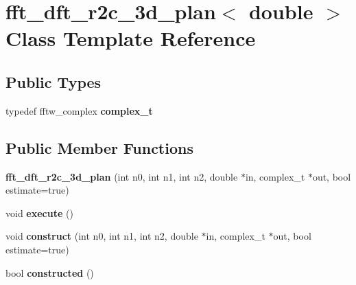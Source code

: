 \hypertarget{classfft__dft__r2c__3d__plan_3_01double_01_4}{
\section{fft\_\-dft\_\-r2c\_\-3d\_\-plan$<$ double $>$ Class Template Reference}
\label{classfft__dft__r2c__3d__plan_3_01double_01_4}
}
\subsection*{Public Types}
\begin{DoxyCompactItemize}
\item 
\hypertarget{classfft__dft__r2c__3d__plan_3_01double_01_4_acb9081f5188f58c64467774b303680a0}{
typedef fftw\_\-complex {\bfseries complex\_\-t}}
\label{classfft__dft__r2c__3d__plan_3_01double_01_4_acb9081f5188f58c64467774b303680a0}

\end{DoxyCompactItemize}
\subsection*{Public Member Functions}
\begin{DoxyCompactItemize}
\item 
\hypertarget{classfft__dft__r2c__3d__plan_3_01double_01_4_af16576afef3939eb04b476a6d3589f30}{
{\bfseries fft\_\-dft\_\-r2c\_\-3d\_\-plan} (int n0, int n1, int n2, double $\ast$in, complex\_\-t $\ast$out, bool estimate=true)}
\label{classfft__dft__r2c__3d__plan_3_01double_01_4_af16576afef3939eb04b476a6d3589f30}

\item 
\hypertarget{classfft__dft__r2c__3d__plan_3_01double_01_4_acd216507da9226fbb4e2ffd9da091296}{
void {\bfseries execute} ()}
\label{classfft__dft__r2c__3d__plan_3_01double_01_4_acd216507da9226fbb4e2ffd9da091296}

\item 
\hypertarget{classfft__dft__r2c__3d__plan_3_01double_01_4_afd9465898cd469aaff98672d9b0ab4db}{
void {\bfseries construct} (int n0, int n1, int n2, double $\ast$in, complex\_\-t $\ast$out, bool estimate=true)}
\label{classfft__dft__r2c__3d__plan_3_01double_01_4_afd9465898cd469aaff98672d9b0ab4db}

\item 
\hypertarget{classfft__dft__r2c__3d__plan_3_01double_01_4_ae0568ff7f9b6f3f065a6240071c0a5d2}{
bool {\bfseries constructed} ()}
\label{classfft__dft__r2c__3d__plan_3_01double_01_4_ae0568ff7f9b6f3f065a6240071c0a5d2}

\end{DoxyCompactItemize}
